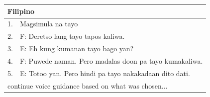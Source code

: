\begin{table}[h]
\begin{tabular}{ll}
\multicolumn{2}{l}{Filipino}                                                                          \\ \hline
1.                      & Magsimula na tayo                                                           \\ \hline
\multicolumn{1}{|l}{2.} & \multicolumn{1}{l|}{F: Deretso lang tayo tapos kaliwa.}                     \\
\multicolumn{1}{|l}{3.} & \multicolumn{1}{l|}{E: Eh kung kumanan tayo bago yan?}                      \\
\multicolumn{1}{|l}{4.} & \multicolumn{1}{l|}{F: Puwede naman. Pero madalas doon pa tayo kumakaliwa.} \\
\multicolumn{1}{|l}{5.} & \multicolumn{1}{l|}{E: Totoo yan. Pero hindi pa tayo nakakadaan dito dati.} \\ \hline
\multicolumn{2}{l}{continue voice guidance based on what was chosen...}                               \\ \hline
\end{tabular}
\end{table}

